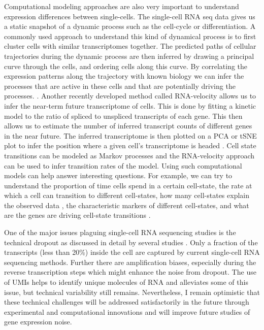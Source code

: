 Computational modeling approaches are also very important to understand expression differences between single-cells. The single-cell RNA seq data gives us a static snapshot of a dynamic process such as the cell-cycle or differentiation. A commonly used approach to understand this kind of dynamical process is to first cluster cells with similar transcriptomes together. The predicted paths of cellular trajectories during the dynamic process are then inferred by drawing a principal curve through the cells, and ordering cells along this curve. By correlating the expression patterns along the trajectory with known biology we can infer the processes that are active in these cells and that are potentially driving the processes. \cite{trapnell_dynamics_2014}. Another recently developed method called RNA-velocity allows us to infer the near-term future transcriptome of cells. This is done by fitting a kinetic model to the ratio of spliced to unspliced transcripts of each gene. This then allows us to estimate the number of inferred transcript counts of different genes in the near future. The inferred transcriptome is then plotted on a PCA or tSNE plot to infer the position where a given cell's transcriptome is headed \cite{manno_rna_2018}. Cell state transitions can be modeled as Markov processes \cite{stumpf_stem_2017} and the RNA-velocity approach can be used to infer transition rates of the model. Using such computational models can help answer interesting questions. For example, we can try to understand the proportion of time cells spend in a certain cell-state,  the rate at which a cell can transition to different cell-states, how many cell-states explain the observed data \cite{chang_transcriptome-wide_2008}, the characteristic markers of different cell-states, and what are the genes are driving cell-state transitions \cite{furchtgott_discovering_2017}.

One of the major issues plaguing single-cell RNA sequencing studies is the technical dropout as discussed in detail by several studies \cite{eling2019nrga} \cite{tung2017sr} \cite{hicks2018ba}. Only a fraction of the transcripts (less than 20\%) inside the cell are captured by current single-cell RNA sequencing methods. Further there are amplification biases, especially during the reverse transcription steps which might enhance the noise from dropout. The use of UMIs helps to identify unique molecules of RNA and alleviates some of this issue, but technical variability still remains. Nevertheless, I remain optimistic that these technical challenges will be addressed satisfactorily in the future through experimental and computational innovations and will improve future studies of gene expression noise.

